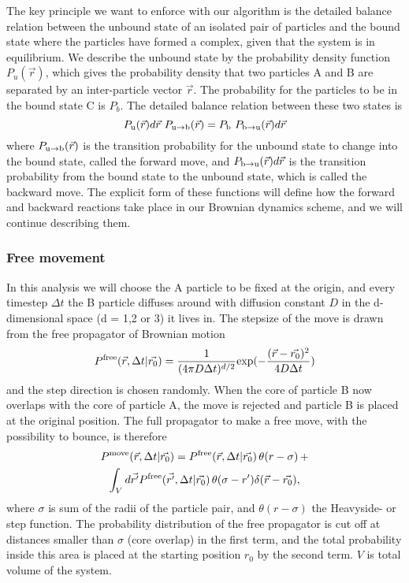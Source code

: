 The key principle we want to enforce with our algorithm is the detailed balance relation between the unbound state of an isolated pair of particles and the bound state where the particles have formed a complex, given that the system is in equilibrium. We describe the unbound state by the probability density function $P_u(\vec{r})$, which gives the probability density that two particles A and B are separated by an inter-particle vector $\vec{r}$. The probability for the particles to be in the bound state C is $P_b$. The detailed balance relation between these two states is
\begin{equation}
 P_{ \rm{u} }(\vec{r})d\vec{r} \,\, P_{ \rm{u} \to \rm{b} }(\vec{r}) = P_{ \rm{b} } \,\, P_{ \rm{b} \to \rm{u} }(\vec{r})d\vec{r}
\elabel{DBeqn}
\end{equation}
where $P_{ \rm{u} \to \rm{b} }(\vec{r})$ is the transition probability for the unbound state to change into the bound state, called the forward move, and $P_{ \rm{b} \to \rm{u}}(\vec{r})d\vec{r}$ is the transition probability from the bound state to the unbound state, which is called the backward move. The explicit form of these functions will define how the forward and backward reactions take place in our Brownian dynamics scheme, and we will continue describing them. 

\subsubsection{Free movement}
In this analysis we will choose the A particle to be fixed at the origin, and every timestep $\Delta t$ the B particle diffuses around with diffusion constant $D$ in the d-dimensional space (d = 1,2 or 3) it lives in. The stepsize of the move is drawn from the free propagator of Brownian motion 
\begin{equation}
 \elabel{BD_freeprop}
P^{\rm free}(\vec{r},\Delta t|\vec{r_0}) = \frac{1}{(4 \pi D \Delta t)^{d/2}}{\rm exp}(-\frac{(\vec{r}-\vec{r_0})^2}{4 D \Delta t}) 
\end{equation}
and the step direction is chosen randomly. When the core of particle B now overlaps with the core of particle A, the move is rejected and particle B is placed at the original position. The full propagator to make a free move, with the possibility to bounce, is therefore
\begin{multline}
 P^{\rm move}(\vec{r},\Delta t|\vec{r_0}) = P^{\rm free}(\vec{r},\Delta t|\vec{r_0}) \, \theta(r - \sigma) \, + \\ \int_{V} d\vec{r'}P^{\rm free}(\vec{r'},\Delta t|\vec{r_0}) \, \theta(\sigma - r')\delta(\vec{r}-\vec{r_0}),
\elabel{move_prop}
\end{multline}
where $\sigma$ is sum of the radii of the particle pair, and $\theta(r - \sigma)$ the Heavyside- or step function. The probability distribution of the free propagator is cut off at distances smaller than $\sigma$ (core overlap) in the first term, and the total probability inside this area is placed at the starting position $r_0$ by the second term. $V$ is total volume of the system.

